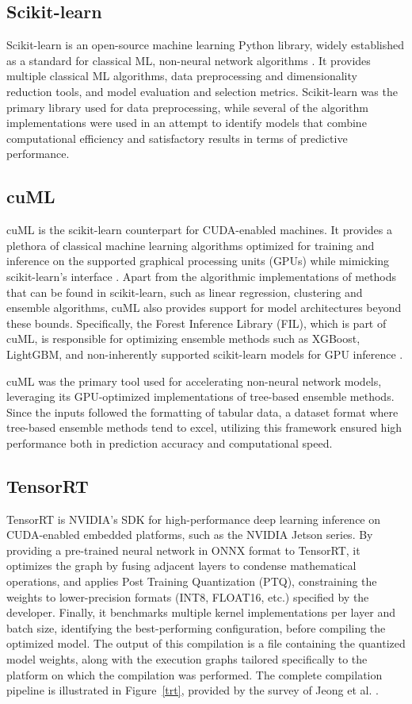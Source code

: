 \subsection{Scikit-learn}
Scikit-learn is an open-source machine learning Python library, widely established as a standard for classical ML, non-neural network algorithms \cite{scikit}. It provides multiple classical ML algorithms, data preprocessing and dimensionality reduction tools, and model evaluation and selection metrics. Scikit-learn was the primary library used for data preprocessing, while several of the algorithm implementations were used in an attempt to identify models that combine computational efficiency and satisfactory results in terms of predictive performance.

\subsection{cuML}
cuML is the scikit-learn counterpart for CUDA-enabled machines. It provides a plethora of classical machine learning algorithms optimized for training and inference on the supported graphical processing units (GPUs) while mimicking scikit-learn's interface \cite{nvidia_cuml_docs}. Apart from the algorithmic implementations of methods that can be found in scikit-learn, such as linear regression, clustering and ensemble algorithms, cuML also provides support for model architectures beyond these bounds. Specifically, the Forest Inference Library (FIL), which is part of cuML, is responsible for optimizing ensemble methods such as XGBoost, LightGBM, and non-inherently supported scikit-learn models for GPU inference \cite{nvidia_fil_2025}. 

cuML was the primary tool used for accelerating non-neural network models, leveraging its GPU-optimized implementations of tree-based ensemble methods. Since the inputs followed the formatting of tabular data, a dataset format where tree-based ensemble methods tend to excel, utilizing this framework ensured high performance both in prediction accuracy and computational speed. 

\subsection{TensorRT}

TensorRT is NVIDIA's SDK for high-performance deep learning inference on CUDA-enabled embedded platforms, such as the NVIDIA Jetson series. By providing a pre-trained neural network in ONNX format to TensorRT, it optimizes the graph by fusing adjacent layers to condense mathematical operations, and applies Post Training Quantization (PTQ), constraining the weights to lower-precision formats (INT8, FLOAT16, etc.) specified by the developer. Finally, it benchmarks multiple kernel implementations per layer and batch size, identifying the best-performing configuration, before compiling the optimized model. The output of this compilation is a file containing the quantized model weights, along with the execution graphs tailored specifically to the platform on which the compilation was performed. The complete compilation pipeline is illustrated in Figure~\ref{trt}, provided by the survey of Jeong et al. \cite{tensor-rt}.

